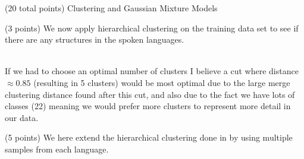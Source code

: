 \documentclass[12pt]{article}
\begin{document}
\begin{question}{(20 total points) Clustering and Gaussian Mixture Models}
\begin{subquestion}{(3 points)
       We now apply hierarchical clustering on the training data set
       to see if there are any structures in the spoken languages.
     }
\begin{answerbox}{43em}
{\\
        If we had to choose an optimal number of clusters I believe a cut where distance $\approx 0.85$ (resulting in 5 clusters) would be most optimal due to the large merge clustering distance found after this cut, and also due to the fact we have lots of classes (22) meaning we would prefer more clusters to represent more detail in our data.
        }
      \end{answerbox}
  


   \end{subquestion}
   \begin{subquestion}{(5 points)
       We here extend the hierarchical clustering done in  by
       using multiple samples from each language.
     } \label{Q3.4}


   


\end{subquestion}
\end{question}
\end{document}
